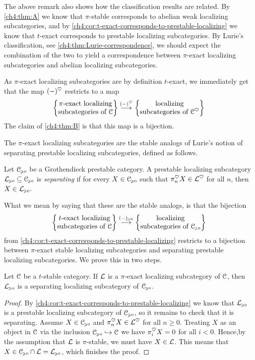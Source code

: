 \begin{remark}
    The above remark also shows how the classification results are related. By \cref{ch4:thm:A} we know that $\pi$-stable corresponds to abelian weak localizing subcategories, and by \cref{ch4:cor:t-exact-corresponds-to-prestable-localizing} we know that $t$-exact corresponds to prestable localizing subcategories. By Lurie's classification, see \cref{ch4:thm:Lurie-correspondence}, we should expect the combination of the two to yield a correspondence between $\pi$-exact localizing subcategories and abelian localizing subcategories. 
\end{remark}

As $\pi$-exact localizing subcategories are by definition $t$-exact, we immediately get that the map $(-)^\heart$ restricts to a map 
\[\piexact\overset{(-)^\heart}\to \ablocalizing\]
The claim of \cref{ch4:thm:B} is that this map is a bijection.  

The $\pi$-exact localizing subcategories are the stable analogs of Lurie's notion of separating prestable localizing subcategories, defined as follows.

\begin{definition}
    Let $\C\geqz$ be a Grothendieck prestable category. A prestable localizing subcategory $\L\geqz \subseteq \C\geqz$ is \emph{separating} if for every $X\in \C\geqz$ such that $\pi_n^\heart X\in \L^\heart$ for all $n$, then $X\in \L\geqz$. 
\end{definition}

What we mean by saying that these are the stable analogs, is that the bijection
\[\texact \overset{(-)\geqz}\to \prlocalizing\]
from \cref{ch4:cor:t-exact-corresponds-to-prestable-localizing} restricts to a bijection between $\pi$-exact stable localizing subcategories and separating prestable localizing subcategories. We prove this in two steps. 

\begin{lemma}
    \label{ch4:lm:pi-exact-then-separating}
    Let $\C$ be a $t$-stable category. If $\L$ is a $\pi$-exact localizing subcategory of $\C$, then $\L\geqz$ is a separating localizing subcategory of $\C\geqz$. 
\end{lemma}
\begin{proof}
    By \cref{ch4:cor:t-exact-corresponds-to-prestable-localizing} we know that $\L\geqz$ is a prestable localizing subcategory of $\C\geqz$, so it remains to check that it is separating. Assume $X\in \C\geqz$ and $\pi_n^\heart X \in \L^\heart$ for all $n\geq 0$. Treating $X$ as an object in $\C$ via the inclusion $\C\geqz \hookrightarrow \C$ we have $\pi_i^\heart X = 0$ for all $i<0$. Hence,by the assumption that $\L$ is $\pi$-stable, we must have $X\in \L$. This means that $X \in \C\geqz\cap \L = \L\geqz$, which finishes the proof. 
\end{proof}

